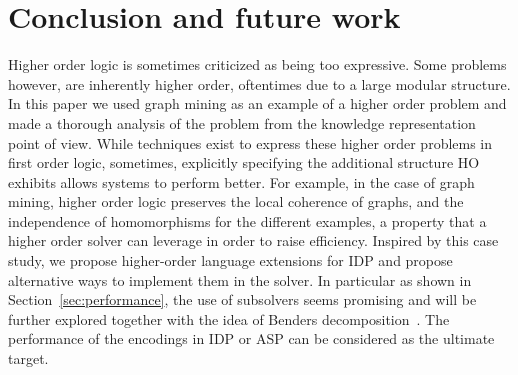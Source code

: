 \section{Conclusion and future work}
\label{sec:conclusion}
Higher order logic is sometimes criticized as being too expressive.
Some problems however, are inherently higher order, oftentimes due to
a large modular structure.
In this paper we used graph mining as an example of a higher order
problem and made a thorough analysis of the problem from the knowledge
representation point of view.
While techniques exist to express these higher order problems in first order logic,
sometimes, explicitly specifying the additional structure HO exhibits
allows systems to perform better.
For example, in the case of graph mining, higher order logic preserves
the local coherence of graphs, and the independence of homomorphisms
for the different examples, a property that a higher order solver can
leverage in order to raise efficiency.
Inspired by this case study, we propose higher-order language
extensions for IDP and propose alternative ways to implement them in the
solver. In particular as shown in Section~\ref{sec:performance}, the use of subsolvers seems promising and will be further explored together with the idea of Benders decomposition~\citep{Benders}.
The performance of the encodings in IDP or ASP can be considered as
the ultimate target.
